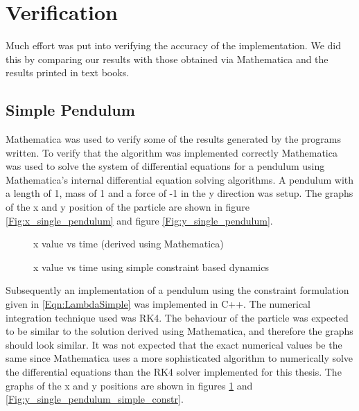 \section{Verification}
Much effort was put into verifying the accuracy of the implementation. We did
this by comparing our results with those obtained via Mathematica and the
results printed in text books.

\subsection{Simple Pendulum}
Mathematica was used to verify some of the results generated by the programs written.
To verify that the algorithm was implemented correctly Mathematica was used to
solve the system of differential equations for a pendulum using Mathematica's
internal differential equation solving algorithms. A pendulum with a length of
1, mass of 1 and a force of -1 in the y direction was setup. The 
graphs of the x and y position of the particle are shown in figure
\ref{Fig:x_single_pendulum} and figure \ref{Fig:y_single_pendulum}.

\begin{figure} 
	\begin{center}
	\end{center}
    \caption{x value vs time (derived using Mathematica)}
\label{Fig:x_single_pendulum}   
	\begin{center}
	\end{center}
    \caption{x value vs time using simple constraint based dynamics}
	\label{Fig:x_single_pendulum_simple_constr}
\end{figure}  

Subsequently an implementation of a pendulum using the constraint formulation
given in \ref{Eqn:LambdaSimple} was implemented in C++. The numerical
integration technique used was RK4. The behaviour of the particle was expected
to be similar to the solution derived using Mathematica, and therefore the
graphs should look similar. It was not expected that the exact numerical values
be the same since Mathematica uses a more sophisticated algorithm to numerically
solve the differential equations than the RK4 solver implemented for this
thesis.  The graphs of the x and y positions are shown in figures
\ref{Fig:x_single_pendulum_simple_constr} and
\ref{Fig:y_single_pendulum_simple_constr}.

